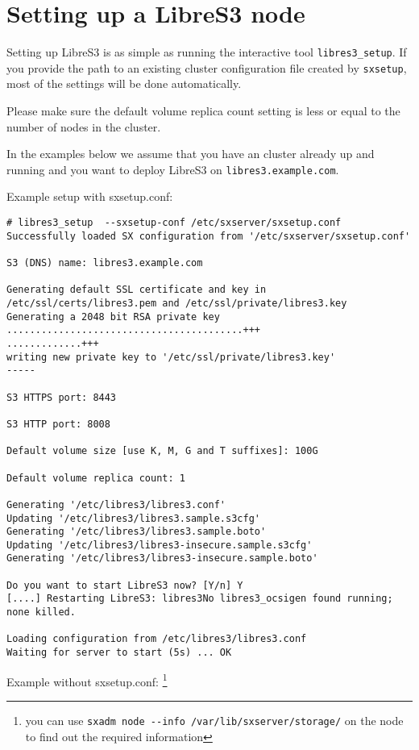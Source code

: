 \section{Setting up a LibreS3 node}

Setting up LibreS3 is as simple as running the interactive tool \verb+libres3_setup+.
If you provide the path to an existing \SX cluster configuration file created
by \verb+sxsetup+, most of the settings will be done automatically.

Please make sure the default volume replica count setting is less or equal
to the number of nodes in the \SX cluster.

In the examples below we assume that you
have an \SX cluster already up and running and you want to deploy
LibreS3 on \verb|libres3.example.com|.

Example setup with sxsetup.conf:

\begin{lstlisting}
# libres3_setup  --sxsetup-conf /etc/sxserver/sxsetup.conf
Successfully loaded SX configuration from '/etc/sxserver/sxsetup.conf'

S3 (DNS) name: libres3.example.com

Generating default SSL certificate and key in /etc/ssl/certs/libres3.pem and /etc/ssl/private/libres3.key
Generating a 2048 bit RSA private key
.........................................+++
.............+++
writing new private key to '/etc/ssl/private/libres3.key'
-----

S3 HTTPS port: 8443

S3 HTTP port: 8008

Default volume size [use K, M, G and T suffixes]: 100G

Default volume replica count: 1

Generating '/etc/libres3/libres3.conf'
Updating '/etc/libres3/libres3.sample.s3cfg'
Generating '/etc/libres3/libres3.sample.boto'
Updating '/etc/libres3/libres3-insecure.sample.s3cfg'
Generating '/etc/libres3/libres3-insecure.sample.boto'

Do you want to start LibreS3 now? [Y/n] Y
[....] Restarting LibreS3: libres3No libres3_ocsigen found running; none killed.

Loading configuration from /etc/libres3/libres3.conf
Waiting for server to start (5s) ... OK
\end{lstlisting}


Example without sxsetup.conf:
\footnote{you can use \verb|sxadm node --info /var/lib/sxserver/storage/| on the \SX node to find out the required information}

